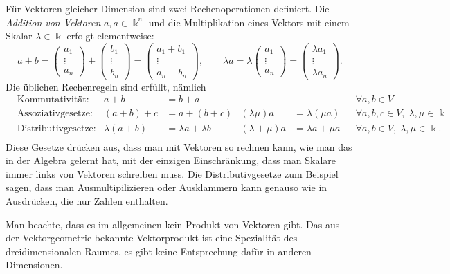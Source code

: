 Für Vektoren gleicher Dimension sind zwei Rechenoperationen definiert.
Die {\em Addition von Vektoren} $a,a\in\Bbbk^n$  und die Multiplikation
eines Vektors mit einem Skalar $\lambda\in\Bbbk$ erfolgt elementweise:
\[
a+b
=
\begin{pmatrix}a_1\\\vdots\\a_n\end{pmatrix}
+
\begin{pmatrix}b_1\\\vdots\\b_n\end{pmatrix}
=
\begin{pmatrix}a_1+b_1\\\vdots\\a_n+b_n\end{pmatrix},
\qquad
\lambda a
=
\lambda
\begin{pmatrix}a_1\\\vdots\\a_n\end{pmatrix}
=
\begin{pmatrix}\lambda a_1\\\vdots\\\lambda a_n\end{pmatrix}.
\]
Die üblichen Rechenregeln sind erfüllt, nämlich 
\begin{equation}
\begin{aligned}
&\text{Kommutativität:}
&
a+b&=b+a
&&
&&\forall a,b\in V
\\
&\text{Assoziativgesetze:}
&
(a+b)+c&=a+(b+c)
&
(\lambda\mu)a&=\lambda(\mu a)
&&\forall a,b,c\in V,\; \lambda,\mu\in\Bbbk
\\
&\text{Distributivgesetze:}
&
\lambda(a+b)&=\lambda a + \lambda b
&
(\lambda+\mu)a&=\lambda a + \mu a
&&\forall a,b\in V,\; \lambda,\mu\in\Bbbk.
\\
\end{aligned}
\label{buch:vektoren-und-matrizen:eqn:vrgesetze}
\end{equation}
Diese Gesetze drücken aus, dass man mit Vektoren so rechnen kann, wie man
das in der Algebra gelernt hat, mit der einzigen Einschränkung, dass
man Skalare immer links von Vektoren schreiben muss.
Die Distributivgesetze zum Beispiel sagen, dass man Ausmultipilizieren
oder Ausklammern kann genauso wie in Ausdrücken, die nur Zahlen enthalten.

Man beachte, dass es im allgemeinen kein Produkt von Vektoren gibt.
Das aus der Vektorgeometrie bekannte Vektorprodukt ist eine Spezialität
des dreidimensionalen Raumes, es gibt keine Entsprechung dafür in anderen
Dimensionen.

